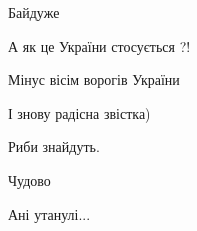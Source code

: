 \begin{itemize}
 
Байдуже

 
А як це України стосується ?!

 
Мінус вісім ворогів України

 
І знову радісна звістка)

 
Риби знайдуть.

 
Чудово

 
Ані утанулі...

 

\end{itemize}

